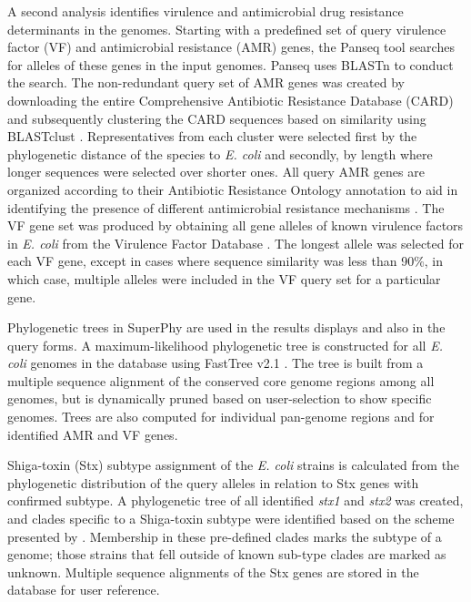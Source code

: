 \documentclass[a4paper,twoside]{article}
\begin{document}
A second analysis identifies virulence and antimicrobial drug resistance determinants in the genomes. Starting with a predefined set of query virulence factor (VF) and antimicrobial resistance (AMR) genes, the Panseq tool searches for alleles of these genes in the input genomes. Panseq uses BLASTn to conduct the search. The non-redundant query set of AMR genes was created by downloading the entire Comprehensive Antibiotic Resistance Database (CARD) \cite{mcarthur2012card} and subsequently clustering the CARD sequences based on similarity using BLASTclust \cite{altschul_gapped_1997}. Representatives from each cluster were selected first by the phylogenetic distance of the species to \textit{E. coli} and secondly, by length where longer sequences were selected over shorter ones. All query AMR genes are organized according to their Antibiotic Resistance Ontology annotation to aid in identifying the presence of different antimicrobial resistance mechanisms \cite{antezana_biological_2009}. The VF gene set was produced by obtaining all gene alleles of known virulence factors in \textit{E. coli} from the Virulence Factor Database \cite{chen2012vfdb,chen2005vfdb}.  The longest allele was selected for each VF gene, except in cases where sequence similarity was less than 90\%, in which case, multiple alleles were included in the VF query set for a particular gene.

Phylogenetic trees in SuperPhy are used in the results displays and also in the query forms. A maximum-likelihood phylogenetic tree is constructed for all \textit{E. coli} genomes in the database using FastTree v2.1 \cite{price_fasttree_2010}. The tree is built from a multiple sequence alignment of the conserved core genome regions among all genomes, but is dynamically pruned based on user-selection to show specific genomes. Trees are also computed for individual pan-genome regions and for identified AMR and VF genes.

Shiga-toxin (Stx) subtype assignment of the \textit{E. coli} strains is calculated from the phylogenetic distribution of the query alleles in relation to Stx genes with confirmed subtype. A phylogenetic tree of all identified \textit{stx1} and \textit{stx2} was created, and clades specific to a Shiga-toxin subtype were identified based on the scheme presented by \cite{scheutz_multicenter_2012}. Membership in these pre-defined clades marks the subtype of a genome; those strains that fell outside of known sub-type clades are marked as unknown. Multiple sequence alignments of the Stx genes are stored in the database for user reference.
\end{document}
